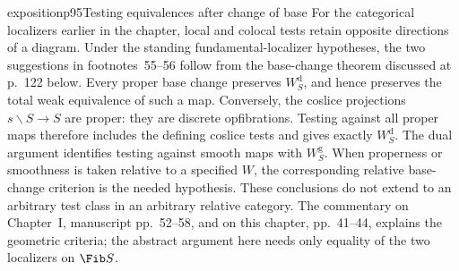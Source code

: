 \begin{dcomment}{exposition}{p95}{Testing equivalences after change of base}
For the categorical localizers earlier in the chapter, local and colocal tests retain opposite directions of a diagram. Under the standing fundamental-localizer hypotheses, the two suggestions in footnotes~55--56 follow from the base-change theorem discussed at p.~122 below. Every proper base change preserves $W_S^{\mathrm d}$, and hence preserves the total weak equivalence of such a map. Conversely, the coslice projections $s\backslash S\to S$ are proper: they are discrete opfibrations. Testing against all proper maps therefore includes the defining coslice tests and gives exactly $W_S^{\mathrm d}$. The dual argument identifies testing against smooth maps with $W_S^{\mathrm g}$. When properness or smoothness is taken relative to a specified $W$, the corresponding relative base-change criterion is the needed hypothesis. These conclusions do not extend to an arbitrary test class in an arbitrary relative category. The commentary on Chapter~I, manuscript pp.~52--58, and on this chapter, pp.~41--44, explains the geometric criteria; the abstract argument here needs only equality of the two localizers on $\Fib S$.
\end{dcomment}

